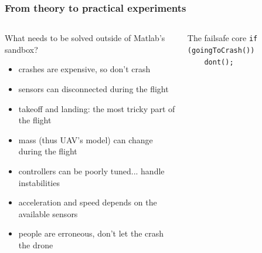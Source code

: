 \documentclass[aspectratio=1610]{beamer}
\begin{document}
\begin{frame}
\begin{columns}[c]


  \end{columns}

\end{frame}


\begin{frame}
  \frametitle{From theory to practical experiments}

  \begin{columns}[c]

    \begin{block}{What needs to be solved outside of Matlab's sandbox?}
      \begin{itemize}
        \item crashes are expensive, so don't crash
        \item sensors can disconnected during the flight
        \item takeoff and landing: the most tricky part of the flight
        \item mass (thus UAV's model) can change during the flight
        \item controllers can be poorly tuned... handle instabilities
        \item acceleration and speed depends on the available sensors
        \item people are erroneous, don't let the crash the drone
      \end{itemize}
    \end{block}

    \begin{block}{The failsafe core}
      \texttt{if (goingToCrash())}\\
      \texttt{~~~~dont();}
    \end{block}

  \end{columns}

\end{frame}
\end{document}
